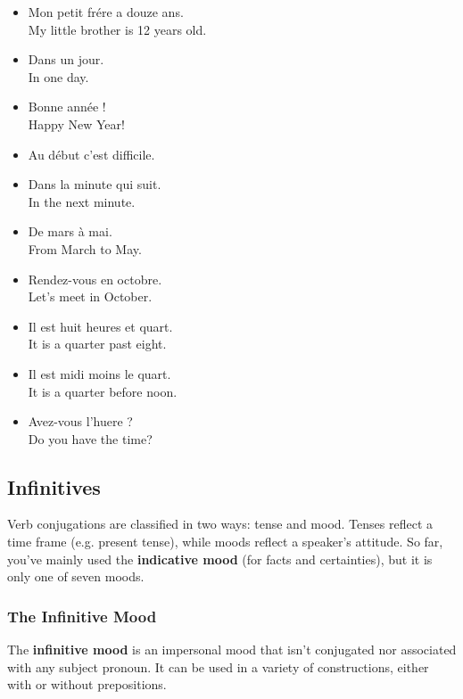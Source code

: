 \begin{itemize}
  \item  Mon petit fr{\'e}re a douze ans. \\ My little brother is 12 years old.
  \item  Dans un jour. \\ In one day.
  \item  Bonne ann{\'e}e ! \\ Happy New Year!
  \item  Au d{\'e}but c'est difficile.
  \item  Dans la minute qui suit. \\ In the next minute.
  \item  De mars {\`a} mai. \\ From March to May.
  \item  Rendez-vous en octobre. \\ Let's meet in October.
  \item  Il est huit heures et quart. \\ It is a quarter past eight.
  \item  Il est midi moins le quart. \\ It is a quarter before noon.
  \item  Avez-vous l'huere ? \\ Do you have the time?
\end{itemize}


\pagebreak
\subsection{Infinitives}

Verb conjugations are classified in two ways: tense and mood. Tenses reflect a time frame (e.g. present tense), while moods reflect a speaker's attitude. So far, you've mainly used the \textbf{indicative mood} (for facts and certainties), but it is only one of seven moods.

\subsubsection{The Infinitive Mood}

The \textbf{infinitive mood} is an impersonal mood that isn't conjugated nor associated with any subject pronoun. It can be used in a variety of constructions, either with or without prepositions.


